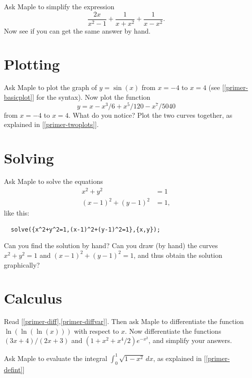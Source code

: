 \documentclass[a4paper,10pt]{amsbook}
\begin{document}
\begin{exercise}\label{ex-rat-misc}
 Ask Maple to simplify the expression 
 \[ \frac{2x}{x^2-1} + \frac{1}{x+x^2} + \frac{1}{x-x^2}. \]
 Now see if you can get the same answer by hand. 
\end{exercise}

\section{Plotting}

\begin{exercise}\label{ex-sin-taylor}
 Ask Maple to plot the graph of $y=\sin(x)$ from $x=-4$ to
 $x=4$ (see [\ref{primer-basicplot}] for the syntax).  Now plot
 the function
 \[ y = x-x^3/6+x^5/120-x^7/5040 \]
 from $x=-4$ to $x=4$.  What do you notice?  Plot the two curves
 together, as explained in [\ref{primer-twoplots}].
\end{exercise}

\section{Solving}

\begin{exercise}
 Ask Maple to solve the equations 
 \begin{align*}
  x^2 + y^2 &= 1 \\
  (x-1)^2 + (y-1)^2 &= 1,
 \end{align*}
 like this:
\begin{verbatim}
  solve({x^2+y^2=1,(x-1)^2+(y-1)^2=1},{x,y});
\end{verbatim}
 Can you find the solution by hand?  Can you draw (by hand)
 the curves $x^2+y^2=1$ and $(x-1)^2+(y-1)^2=1$, and thus
 obtain the solution graphically?
\end{exercise}

\section{Calculus}

\begin{exercise}
 Read [\ref{primer-diff},\ref{primer-diffvar}].  Then ask Maple to
 differentiate the function $\ln(\ln(\ln(x)))$ with respect
 to $x$.  Now differentiate the functions $(3x+4)/(2x+3)$
 and $(1+x^2+x^4/2)e^{-x^2}$, and simplify your answers.
\end{exercise}

\begin{exercise}
 Ask Maple to evaluate the integral
 $\int_0^1\sqrt{1-x^2}\,dx$, as explained in [\ref{primer-defint}]
\end{exercise}
\end{document}

